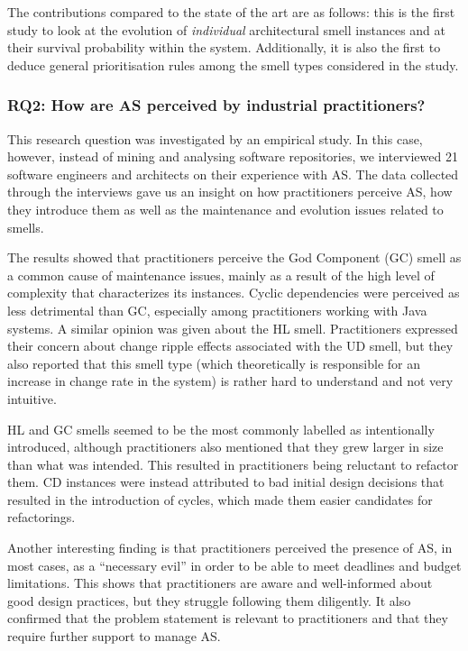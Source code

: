 The contributions compared to the state of the art are as follows: this is the first study to look at the evolution of \emph{individual} architectural smell instances and at their survival probability within the system.
Additionally, it is also the first to deduce general prioritisation rules among the smell types considered in the study.

\subsubsection*{RQ2: How are AS perceived by industrial practitioners?}
This research question was investigated by an empirical study.
In this case, however, instead of mining and analysing software repositories, we interviewed 21 software engineers and architects on their experience with AS.
The data collected through the interviews gave us an insight on how practitioners perceive AS, how they introduce them as well as the maintenance and evolution issues related to smells. 

The results showed that practitioners perceive the God Component (GC) smell as a common cause of maintenance issues, mainly as a result of the high level of complexity that characterizes its instances. 
Cyclic dependencies were perceived as less detrimental than GC, especially among practitioners working with Java systems. A similar opinion was given about the HL smell.
Practitioners expressed their concern about change ripple effects associated with the UD smell, but they also reported that this smell type (which theoretically is responsible for an increase in change rate in the system) is rather hard to understand and not very intuitive. 

HL and GC smells seemed to be the most commonly labelled as intentionally introduced, although practitioners also mentioned that they grew larger in size than what was intended.
This resulted in practitioners being reluctant to refactor them.
CD instances were instead attributed to bad initial design decisions that resulted in the introduction of cycles, which made them easier candidates for refactorings.

Another interesting finding is that practitioners perceived the presence of AS, in most cases, as a ``necessary evil'' in order to be able to meet deadlines and budget limitations.
This shows that practitioners are aware and well-informed about good design practices, but they struggle following them diligently.
It also confirmed that the problem statement is relevant to practitioners and that they require further support to manage AS.

